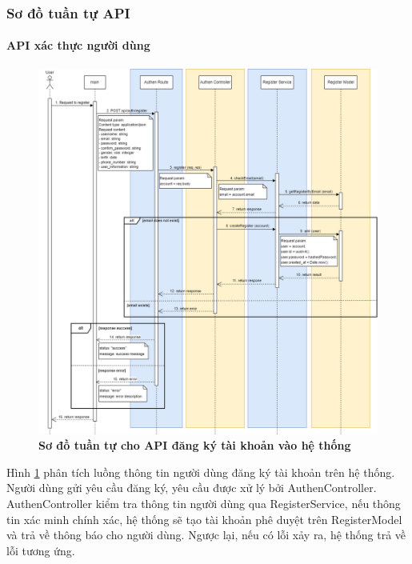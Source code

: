



\subsubsection{Sơ đồ tuần tự API}



\paragraph{API xác thực người dùng}
\mbox{}

\begin{figure}[H]
  \centering
  \includegraphics[scale=0.4]{Images/sequence_api/register.png}
  \caption[Sơ đồ tuần tự cho API đăng ký tài khoản vào hệ thống]{\bfseries \fontsize{12pt}{0pt}
  \selectfont Sơ đồ tuần tự cho API đăng ký tài khoản vào hệ thống }
  \label{api_register} %
\end{figure}
Hình \ref{api_register} phân tích luồng thông tin người dùng đăng ký tài khoản trên hệ thống. Người dùng gửi yêu cầu đăng ký, yêu cầu được xử lý bởi AuthenController. AuthenController kiểm tra thông tin người dùng qua RegisterService, 
nếu thông tin xác minh chính xác, hệ thống sẽ tạo tài khoản phê duyệt trên RegisterModel và trả về thông báo cho người dùng. Ngược lại, nếu có lỗi xảy ra, hệ thống trả về lỗi tương ứng. 

